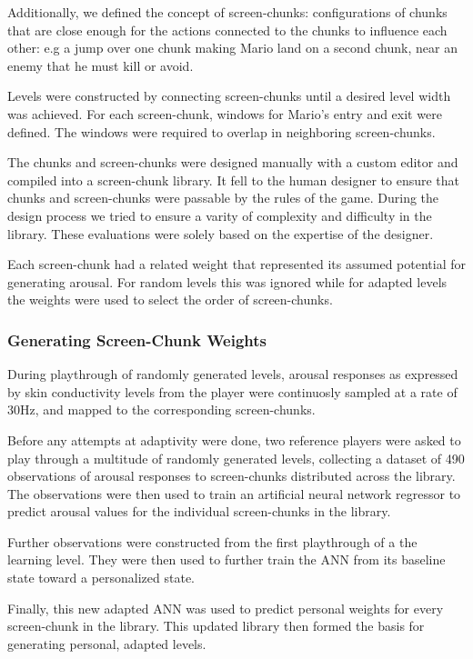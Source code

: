 \documentclass{llncs}
\begin{document}
Additionally, we defined the concept of screen-chunks: configurations of chunks that are close enough for the actions connected to the chunks to influence each other: e.g a jump over one chunk making Mario land on a second chunk, near an enemy that he must kill or avoid.

Levels were constructed by connecting screen-chunks until a desired level width was achieved. For each screen-chunk, windows for Mario's entry and exit were defined. The windows were required to overlap in neighboring screen-chunks.

The chunks and screen-chunks were designed manually with a custom editor and compiled into a screen-chunk library.
It fell to the human designer to ensure that chunks and screen-chunks were passable by the rules of the game.
During the design process we tried to ensure a varity of complexity and difficulty in the library. These evaluations were solely based on the expertise of the designer.

Each screen-chunk had a related weight that represented its assumed potential for generating arousal. For random levels this was ignored while for adapted levels the weights were used to select the order of screen-chunks.

\subsubsection{Generating Screen-Chunk Weights}
During playthrough of randomly generated levels, arousal responses as expressed by skin conductivity levels from the player were continuosly sampled at a rate of 30Hz, and mapped to the corresponding screen-chunks.

Before any attempts at adaptivity were done, two reference players were asked to play through a multitude of randomly generated levels, collecting a dataset of 490 observations of arousal responses to screen-chunks distributed across the library.%
The observations were then used to train an artificial neural network regressor to predict arousal values for the individual screen-chunks in the library.

Further observations were constructed from the first playthrough of a the learning level. They were then used to further train the ANN from its baseline state toward a personalized state.

Finally, this new adapted ANN was used to predict personal weights for every screen-chunk in the library. This updated library then formed the basis for generating personal, adapted levels.
\end{document}
